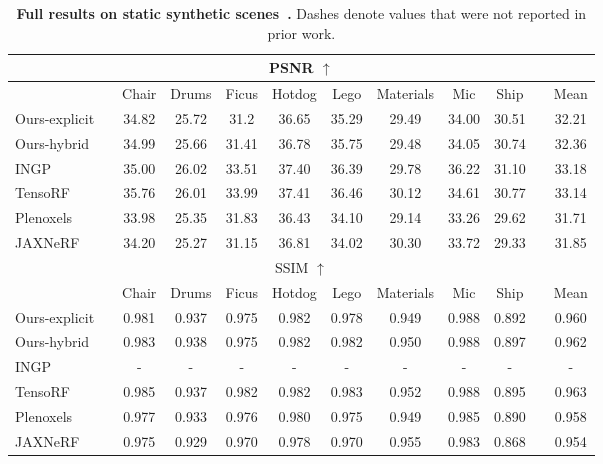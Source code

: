 \documentclass[10pt,twocolumn,letterpaper]{article}
\begin{document}
\renewcommand{\tabcolsep}{6pt}
\begin{table*}
  \centering
  \begin{tabular}{llcccccccclc}
    \multicolumn{12}{c}{PSNR $\uparrow$} \\
    \toprule
    && Chair & Drums & Ficus & Hotdog & Lego & Materials & Mic & Ship && Mean \\
    \cmidrule(){1-1} \cmidrule(){3-10} \cmidrule(){12-12}
    Ours-explicit && 34.82 &	25.72 &	31.2 &	36.65 &	35.29 &	29.49 &	34.00 &	30.51 &&	32.21 \\
    Ours-hybrid && 34.99 &	25.66 &	31.41 &	36.78 &	35.75 &	29.48 &	34.05 &	30.74 &&	32.36 \\
INGP~\cite{ingp}                       && 35.00 & 26.02 & 33.51 & 37.40 & 36.39 & 29.78 & 36.22 & 31.10 && 33.18 \\
    TensoRF~\cite{tensorf}                 && 35.76 & 26.01 & 33.99 & 37.41 & 36.46 & 30.12 & 34.61 & 30.77 && 33.14 \\
    Plenoxels~\cite{plenoxels}             && 33.98 & 25.35 & 31.83 & 36.43 & 34.10 & 29.14 & 33.26 & 29.62 && 31.71 \\
    JAXNeRF~\cite{jaxnerf2020github, nerf} && 34.20 & 25.27 & 31.15 & 36.81 & 34.02 & 30.30 & 33.72 & 29.33 && 31.85 \\
    \bottomrule
    \multicolumn{12}{c}{SSIM $\uparrow$} \\
    \toprule
    && Chair & Drums & Ficus & Hotdog & Lego & Materials & Mic & Ship && Mean \\ 
    \cmidrule(){1-1} \cmidrule(){3-10} \cmidrule(){12-12}
    Ours-explicit && 0.981 &	0.937 &	0.975 &	0.982 &	0.978 &	0.949 &	0.988 &	0.892 &&	0.960 \\
    Ours-hybrid && 0.983 &	0.938 &	0.975 &	0.982 &	0.982 &	0.950 &	0.988 &	0.897 &&	0.962 \\
INGP          && -     & -     & -     & -     & -     & -     & -     & -     && -     \\
    TensoRF       && 0.985 & 0.937 & 0.982 & 0.982 & 0.983 & 0.952 & 0.988 & 0.895 && 0.963 \\
    Plenoxels     && 0.977 & 0.933 & 0.976 & 0.980 & 0.975 & 0.949 & 0.985 & 0.890 && 0.958 \\
    JAXNeRF       && 0.975 & 0.929 & 0.970 & 0.978 & 0.970 & 0.955 & 0.983 & 0.868 && 0.954 \\
    \bottomrule
  \end{tabular}
  \caption{\textbf{Full results on static synthetic scenes~\cite{nerf}.} Dashes denote values that were not reported in prior work.}
  \label{tab:fullsynthetic}
\end{table*}
\end{document}
